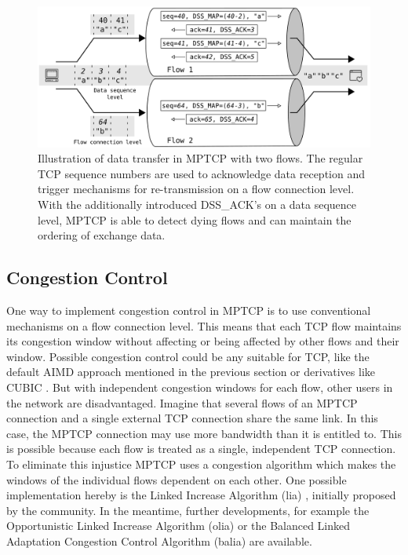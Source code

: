 \begin{figure}
	\begin{center}
		\def\svgwidth{1\textwidth}
		\includegraphics[scale=0.2]{../illustrations/importantConcepts/MPTCPDataTransfer.pdf}  
		\caption[]{Illustration of data transfer in MPTCP with two flows. The regular TCP sequence numbers are used to acknowledge data reception and trigger mechanisms for re-transmission on a flow connection level. With the additionally introduced DSS\_ACK's on a data sequence level, MPTCP is able to detect dying flows and can maintain the ordering of exchange data.}
		\label{fig:MPTCPDataTransfer}
	\end{center}
\end{figure}

\subsection*{Congestion Control}

One way to implement congestion control in MPTCP is to use conventional mechanisms on a flow connection level. This means that each TCP flow maintains its congestion window without affecting or being affected by other flows and their window. Possible congestion control could be any suitable for TCP, like the default AIMD approach \cite{rfc5681} mentioned in the previous section or derivatives like CUBIC \cite{rfc8312}. But with independent congestion windows for each flow, other users in the network are disadvantaged. Imagine that several flows of an MPTCP connection and a single external TCP connection share the same link. In this case, the MPTCP connection may use more bandwidth than it is entitled to.  This is possible because each flow is treated as a single, independent TCP connection. To eliminate this injustice MPTCP uses a congestion algorithm which makes the windows of the individual flows dependent on each other. One possible implementation hereby is the Linked Increase Algorithm (lia) \cite{rfc6356}, initially proposed by the community.  In the meantime, further developments, for example the Opportunistic Linked Increase Algorithm (olia) \cite{khalili-mptcp-congestion-control-05}  or the Balanced Linked Adaptation Congestion Control Algorithm (balia) \cite{walid-mptcp-congestion-control-04} are available.

